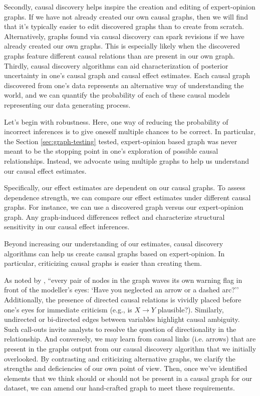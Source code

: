 Secondly, causal discovery helps inspire the creation and editing of expert-opinion graphs.
If we have not already created our own causal graphs, then we will find that it's typically easier to edit discovered graphs than to create from scratch.
Alternatively, graphs found via causal discovery can spark revisions if we have already created our own graphs.
This is especially likely when the discovered graphs feature different causal relations than are present in our own graph.
Thirdly, causal discovery algorithms can aid characterization of posterior uncertainty in one's causal graph and causal effect estimates.
Each causal graph discovered from one's data represents an alternative way of understanding the world, and we can quantify the probability of each of these causal models representing our data generating process.

Let's begin with robustness.
Here, one way of reducing the probability of incorrect inferences is to give oneself multiple chances to be correct.
In particular, the Section \ref{sec:graph-testing} tested, expert-opinion based graph was never meant to be the stopping point in one's exploration of possible causal relationships.
Instead, we advocate using multiple graphs to help us understand our causal effect estimates.

Specifically, our effect estimates are dependent on our causal graphs.
To assess dependence strength, we can compare our effect estimates under different causal graphs.
For instance, we can use a discovered graph versus our expert-opinion graph.
Any graph-induced differences reflect and characterize structural sensitivity in our causal effect inferences.

Beyond increasing our understanding of our estimates, causal discovery algorithms can help us create causal graphs based on expert-opinion.
In particular, criticizing causal graphs is easier than creating them.

As noted by \citet[p. 708]{pearl_1995_causal}, ``every pair of nodes in the graph waves its own warning flag in front of the modeller's eyes: `Have you neglected an arrow or a dashed arc?''
Additionally, the presence of directed causal relations is vividly placed before one's eyes for immediate criticism (e.g., is $X \rightarrow Y$ plausible?).
Similarly, undirected or bi-directed edges between variables highlight causal ambiguity.
Such call-outs invite analysts to resolve the question of directionality in the relationship.
And conversely, we may learn from causal links (i.e. arrows) that are present in the graphs output from our causal discovery algorithm that we initially overlooked.
By contrasting and criticizing alternative graphs, we clarify the strengths and deficiencies of our own point of view.
Then, once we've identified elements that we think should or should not be present in a causal graph for our dataset, we can amend our hand-crafted graph to meet these requirements.

